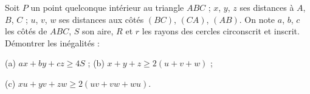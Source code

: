 Soit $P$ un point quelconque intérieur au triangle $ABC$ ; $x$, $y$, $z$ ses distances à $A$, $B$, $C$ ; $u$, $v$, $w$ ses distances aux côtés $(BC)$, $(CA)$, $(AB)$. On note $a$, $b$, $c$ les côtés de $ABC$, $S$ son aire, $R$ et $r$ les rayons des cercles circonscrit et inscrit. Démontrer les inégalités :

(a) $ax + by + cz \geq 4S$ ; (b) $x + y + z \geq 2(u + v + w)$ ;

(c) $xu + yv + zw \geq 2(uv + vw + wu)$.
